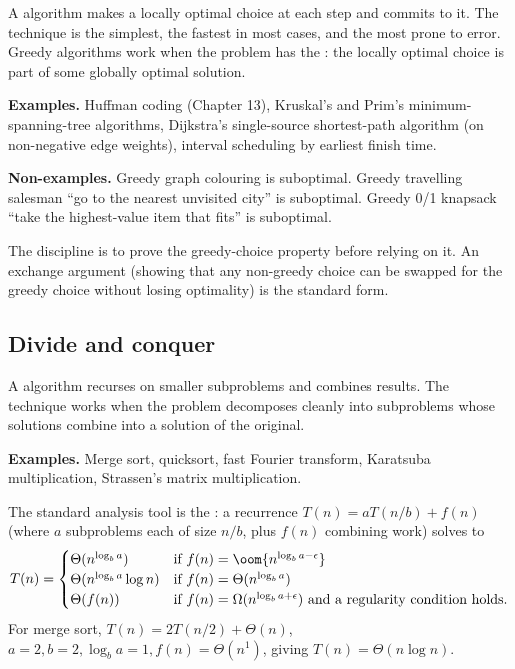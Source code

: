 A  algorithm makes a locally optimal choice at each step and commits to it. The technique is the simplest, the fastest in most cases, and the most prone to error. Greedy algorithms work when the problem has the : the locally optimal choice is part of some globally optimal solution.

\textbf{Examples.} Huffman coding (Chapter 13), Kruskal's and Prim's minimum-spanning-tree algorithms, Dijkstra's single-source shortest-path algorithm (on non-negative edge weights), interval scheduling by earliest finish time.

\textbf{Non-examples.} Greedy graph colouring is suboptimal. Greedy travelling salesman ``go to the nearest unvisited city'' is suboptimal. Greedy 0/1 knapsack ``take the highest-value item that fits'' is suboptimal.

The discipline is to prove the greedy-choice property before relying on it. An exchange argument (showing that any non-greedy choice can be swapped for the greedy choice without losing optimality) is the standard form.

\subsection{Divide and conquer}

A  algorithm recurses on smaller subproblems and combines results. The technique works when the problem decomposes cleanly into subproblems whose solutions combine into a solution of the original.

\textbf{Examples.} Merge sort, quicksort, fast Fourier transform, Karatsuba multiplication, Strassen's matrix multiplication.

The standard analysis tool is the : a recurrence $T(n) = aT(n/b) + f(n)$ (where $a$ subproblems each of size $n/b$, plus $f(n)$ combining work) solves to
\[
T(n) = \begin{cases}
  \Theta(n^{\log_b a}) & \text{if } f(n) = \oom{n^{\log_b a - \epsilon}} \\
  \Theta(n^{\log_b a} \log n) & \text{if } f(n) = \Theta(n^{\log_b a}) \\
  \Theta(f(n)) & \text{if } f(n) = \Omega(n^{\log_b a + \epsilon}) \text{ and a regularity condition holds.}
\end{cases}
\]
For merge sort, $T(n) = 2 T(n/2) + \Theta(n)$, $a = 2, b = 2, \log_b a = 1, f(n) = \Theta(n^1)$, giving $T(n) = \Theta(n \log n)$.

